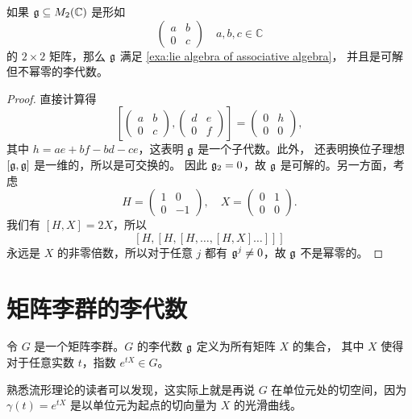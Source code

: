\begin{proposition}
  如果 $\mathfrak{g}\subseteq  M_2(\mathbb{C})$ 是形如
  \[
    \begin{pmatrix}
      a & b \\ 0 & c
    \end{pmatrix}\quad a,b,c\in \mathbb{C}
  \]
  的 $2\times 2$ 矩阵，那么 $\mathfrak{g}$ 满足 \autoref{exa:lie algebra of associative algebra}，
  并且是可解但不幂零的李代数。
\end{proposition}
\begin{proof}
  直接计算得 
  \[
    \left[\begin{pmatrix}
      a & b \\ 0 & c
    \end{pmatrix},\begin{pmatrix}
      d & e \\ 0 & f
    \end{pmatrix}\right]=\begin{pmatrix}
      0 & h \\ 0 & 0 
    \end{pmatrix},
  \]
  其中 $h=ae+bf-bd-ce$，这表明 $\mathfrak{g}$ 是一个子代数。此外，
  还表明换位子理想 $[\mathfrak{g},\mathfrak{g}]$ 是一维的，所以是可交换的。
  因此 $\mathfrak{g}_2=0$，故 $\mathfrak{g}$ 是可解的。另一方面，考虑
  \[
    H=\begin{pmatrix}
      1 & 0 \\ 0 & -1
    \end{pmatrix},\quad
    X=\begin{pmatrix}
      0 & 1 \\ 0 & 0
    \end{pmatrix}.
  \]
  我们有 $[H,X]=2X$，所以
  \[
    [H,[H,[H,\dots,[H,X]\dots]]]
  \]
  永远是 $X$ 的非零倍数，所以对于任意 $j$ 都有 $\mathfrak{g}^j\neq 0$，故 $\mathfrak{g}$ 不是幂零的。
\end{proof}

\section{矩阵李群的李代数}

\begin{definition}
  令 $G$ 是一个矩阵李群。$G$ 的李代数 $\mathfrak{g}$ 定义为所有矩阵 $X$ 的集合，
  其中 $X$ 使得对于任意实数 $t$，指数 $e^{tX}\in G$。
\end{definition}

熟悉流形理论的读者可以发现，这实际上就是再说 $G$ 在单位元处的切空间，因为
$\gamma(t)=e^{tX}$ 是以单位元为起点的切向量为 $X$ 的光滑曲线。

